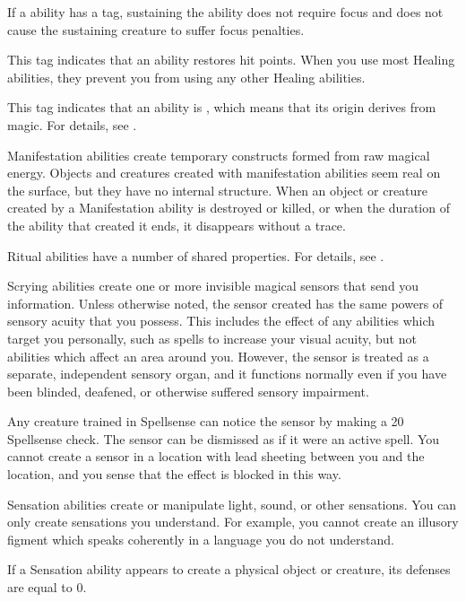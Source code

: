 If a  ability has a  tag, sustaining the ability does not require focus and does not cause the sustaining creature to suffer focus penalties.

 This tag indicates that an ability restores hit points.
When you use most Healing abilities, they  prevent you from using any other Healing abilities.

 This tag indicates that an ability is , which means that its origin derives from magic.
For details, see .

 Manifestation abilities create temporary constructs formed from raw magical energy.
Objects and creatures created with manifestation abilities seem real on the surface, but they have no internal structure.
When an object or creature created by a Manifestation ability is destroyed or killed, or when the duration of the ability that created it ends, it disappears without a trace.

 Ritual abilities have a number of shared properties.
For details, see .

 Scrying abilities create one or more invisible magical sensors that send you information.
Unless otherwise noted, the sensor created has the same powers of sensory acuity that you possess.
This includes the effect of any abilities which target you personally, such as spells to increase your visual acuity, but not abilities which affect an area around you.
However, the sensor is treated as a separate, independent sensory organ, and it functions normally even if you have been blinded, deafened, or otherwise suffered sensory impairment.
\par Any creature trained in Spellsense can notice the sensor by making a  20 Spellsense check.
The sensor can be dismissed as if it were an active spell.
You cannot create a sensor in a location with lead sheeting between you and the location, and you sense that the effect is blocked in this way.

 Sensation abilities create or manipulate light, sound, or other sensations.
You can only create sensations you understand.
For example, you cannot create an illusory figment which speaks coherently in a language you do not understand.
\par If a Sensation ability appears to create a physical object or creature, its defenses are equal to 0.

